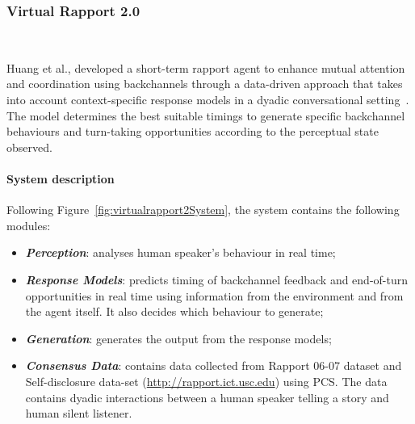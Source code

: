 \subsubsection{Virtual Rapport 2.0} \hspace*{\fill} \\
\label{sub:sec:virtualrapport2}

Huang et al., developed a short-term rapport agent to enhance mutual attention and coordination using backchannels through a data-driven approach that takes into account context-specific response models in a dyadic conversational setting~\cite{Buschmeier2011}. The model determines the best suitable timings to generate specific backchannel behaviours and turn-taking opportunities according to the perceptual state observed.


\paragraph{\textbf{System description}}

Following Figure~\ref{fig:virtualrapport2System}, the system contains the following modules:
\begin{itemize}
	\item \textbf{\textit{Perception}}: analyses human speaker's behaviour in real time;
	\item \textbf{\textit{Response Models}}: predicts timing of backchannel feedback and end-of-turn opportunities in real time using information from the environment and from the agent itself. It also decides which behaviour to generate;
	\item \textbf{\textit{Generation}}: generates the output from the response models;	
	\item \textbf{\textit{Consensus Data}}: contains data collected from Rapport 06-07 dataset and Self-disclosure data-set (\url{http://rapport.ict.usc.edu}) using \ac{PCS}. The data contains dyadic interactions between a human speaker telling a story and human silent listener.
\end{itemize}

